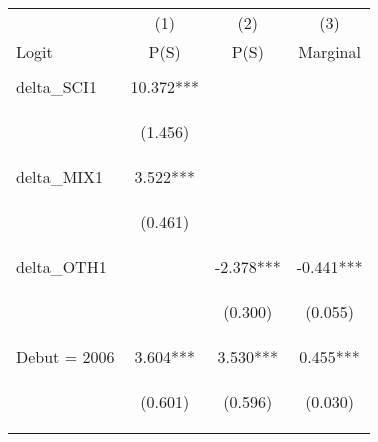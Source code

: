 \begin{center}
\begin{tabular}{lccc} \hline
 & (1) & (2) & (3) \\
Logit & P(S) & P(S) & Marginal \\ \hline
\vspace{4pt} & \begin{footnotesize}\end{footnotesize} & \begin{footnotesize}\end{footnotesize} & \begin{footnotesize}\end{footnotesize} \\
delta\_SCI1 & 10.372*** &  &  \\
\vspace{4pt} & \begin{footnotesize}(1.456)\end{footnotesize} & \begin{footnotesize}\end{footnotesize} & \begin{footnotesize}\end{footnotesize} \\
delta\_MIX1 & 3.522*** &  &  \\
\vspace{4pt} & \begin{footnotesize}(0.461)\end{footnotesize} & \begin{footnotesize}\end{footnotesize} & \begin{footnotesize}\end{footnotesize} \\
delta\_OTH1 &  & -2.378*** & -0.441*** \\
\vspace{4pt} & \begin{footnotesize}\end{footnotesize} & \begin{footnotesize}(0.300)\end{footnotesize} & \begin{footnotesize}(0.055)\end{footnotesize} \\
Debut = 2006 & 3.604*** & 3.530*** & 0.455*** \\
\vspace{4pt} & \begin{footnotesize}(0.601)\end{footnotesize} & \begin{footnotesize}(0.596)\end{footnotesize} & \begin{footnotesize}(0.030)\end{footnotesize} \\

\end{tabular}
\end{center}
